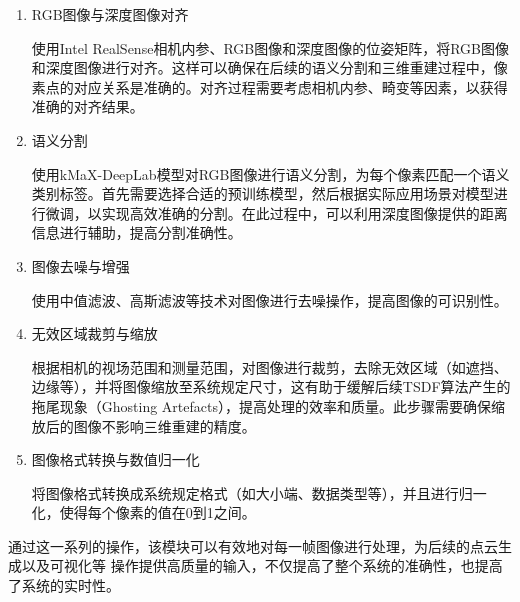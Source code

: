 \begin{enumerate}
	\item{RGB图像与深度图像对齐}
	\par 使用Intel RealSense相机内参、RGB图像和深度图像的位姿矩阵，将RGB图像和深度图像进行对齐。这样可以确保在后续的语义分割和三维重建过程中，像素点的对应关系是准确的。对齐过程需要考虑相机内参、畸变等因素，以获得准确的对齐结果。

	\item{语义分割}
	\par 使用kMaX-DeepLab模型对RGB图像进行语义分割，为每个像素匹配一个语义类别标签。首先需要选择合适的预训练模型，然后根据实际应用场景对模型进行微调，以实现高效准确的分割。在此过程中，可以利用深度图像提供的距离信息进行辅助，提高分割准确性。

	\item{图像去噪与增强}
	\par 使用中值滤波、高斯滤波等技术对图像进行去噪操作，提高图像的可识别性。

	\item{无效区域裁剪与缩放}
	\par 根据相机的视场范围和测量范围，对图像进行裁剪，去除无效区域（如遮挡、边缘等），并将图像缩放至系统规定尺寸，这有助于缓解后续TSDF算法产生的拖尾现象（Ghosting Artefacts），提高处理的效率和质量。此步骤需要确保缩放后的图像不影响三维重建的精度。

	\item{图像格式转换与数值归一化}
	\par 将图像格式转换成系统规定格式（如大小端、数据类型等），并且进行归一化，使得每个像素的值在0到1之间。
\end{enumerate}

\par 通过这一系列的操作，该模块可以有效地对每一帧图像进行处理，为后续的点云生成以及可视化等
操作提供高质量的输入，不仅提高了整个系统的准确性，也提高了系统的实时性。

